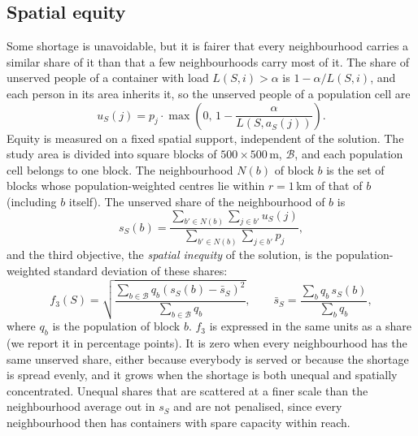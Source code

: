 \subsection{Spatial equity}
\label{sec:equity}
Some shortage is unavoidable, but it is fairer that every neighbourhood carries a similar share of it than that a few neighbourhoods carry most of it. The share of unserved people of a container with load $L(S,i) > \alpha$ is $1 - \alpha / L(S,i)$, and each person in its area inherits it, so the unserved people of a population cell are
\begin{equation}
    u_S(j) = p_j \cdot \max\left(0,\, 1 - \frac{\alpha}{L(S, a_S(j))}\right).
\end{equation}
Equity is measured on a fixed spatial support, independent of the solution. The study area is divided into square blocks of $500 \times 500$\,m, $\mathcal{B}$, and each population cell belongs to one block. The neighbourhood $N(b)$ of block $b$ is the set of blocks whose population-weighted centres lie within $r = 1$\,km of that of $b$ (including $b$ itself). The unserved share of the neighbourhood of $b$ is
\begin{equation}
    s_S(b) = \frac{\sum_{b' \in N(b)} \sum_{j \in b'} u_S(j)}{\sum_{b' \in N(b)} \sum_{j \in b'} p_j},
\end{equation}
and the third objective, the \emph{spatial inequity} of the solution, is the population-weighted standard deviation of these shares:
\begin{equation}
    f_3(S) = \sqrt{\frac{\sum_{b \in \mathcal{B}} q_b \left(s_S(b) - \bar{s}_S\right)^2}{\sum_{b \in \mathcal{B}} q_b}}, \qquad \bar{s}_S = \frac{\sum_{b} q_b\, s_S(b)}{\sum_{b} q_b},
\end{equation}
where $q_b$ is the population of block $b$. $f_3$ is expressed in the same units as a share (we report it in percentage points). It is zero when every neighbourhood has the same unserved share, either because everybody is served or because the shortage is spread evenly, and it grows when the shortage is both unequal and spatially concentrated. Unequal shares that are scattered at a finer scale than the neighbourhood average out in $s_S$ and are not penalised, since every neighbourhood then has containers with spare capacity within reach.

